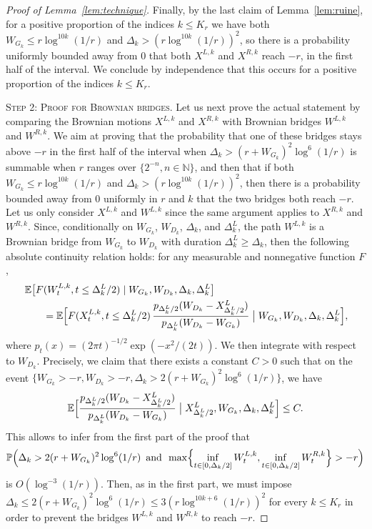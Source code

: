 \documentclass[10pt,a4paper]{amsart}
\newcommand{\E}{\mathop{}\!\mathbb{E}}
\newcommand{\N}{\mathbb{N}}
\renewcommand{\P}{\mathop{}\!\mathbb{P}}
\begin{document}
\begin{proof}[Proof of Lemma~\ref{lem:technique}]
Finally, by the last claim of Lemma~\ref{lem:ruine}, for a positive proportion of the indices $k \leq K_r$ we have both $W_{G_k} \leq r \log^{10k}(1/r)$ and $\Delta_k > (r \log^{10k}(1/r))^2$, so there is a probability uniformly bounded away from $0$ that both $X^{L,k}$ and $X^{R,k}$ reach $-r$, in the first half of the interval.
We conclude by independence that this occurs for a positive proportion of the indices $k \leq K_r$.
\medskip

\textsc{Step 2: Proof for Brownian bridges.}
Let us next prove the actual statement by comparing the Brownian motions $X^{L,k}$ and $X^{R,k}$ with Brownian bridges $W^{L,k}$ and $W^{R,k}$. We aim at proving that the probability that one of these bridges stays above $-r$ in the first half of the interval when $\Delta_k > (r+W_{G_k})^2 \log^6(1/r)$ is summable when $r$ ranges over $\{2^{-n}, n \in\N\}$, and then that if both $W_{G_k} \leq r \log^{10k}(1/r)$ and $\Delta_k > (r \log^{10k}(1/r))^2$, then there is a probability bounded away from $0$ uniformly in $r$ and $k$ that the two bridges both reach $-r$.
Let us only consider $X^{L,k}$ and $W^{L,k}$ since the same argument applies to $X^{R,k}$ and $W^{R,k}$.
Since, conditionally on $W_{G_k}$, $W_{D_k}$, $\Delta_k$, and $\Delta^L_k$, the path $W^{L,k}$ is a Brownian bridge from $W_{G_k}$ to $W_{D_k}$ with duration $\Delta^L_k \geq \Delta_k$, then the following absolute continuity relation holds: for any measurable and nonnegative function $F$,
\begin{align*}
&\E\bigl[F(W^{L,k}_{t}, t \leq \Delta^L_k/2) \mid W_{G_k}, W_{D_k}, \Delta_k, \Delta^L_k\bigr] \\
& \qquad = \E\Bigl[F(X^{L,k}_t, t \leq \Delta^L_k/2) \, \frac{p_{\Delta^L_k/2}(W_{D_k}-X^L_{\Delta^L_k/2})}{p_{\Delta^L_k}(W_{D_k}-W_{G_k})} \bigm| W_{G_k}, W_{D_k}, \Delta_k, \Delta^L_k\Bigr]
,
\end{align*}
where $p_t(x) = (2\pi t)^{-1/2} \exp(-x^2/(2t))$.
We then integrate with respect to $W_{D_k}$. Precisely, we claim that there exists a constant $C>0$ such that
on the event $\{W_{G_k}>-r, W_{D_k}>-r, \Delta_k > 2(r+W_{G_k})^2 \log^6(1/r)\}$, we have
\begin{equation}\label{eq:borne_ratio_technique}
\E\Bigl[\frac{p_{\Delta^L_k/2}(W_{D_k}-X^L_{\Delta^L_k/2})}{p_{\Delta^L_k}(W_{D_k}-W_{G_k})} \bigm| X^L_{\Delta^L_k/2}, W_{G_k}, \Delta_k, \Delta^L_k\Bigr]
\leq C
.\end{equation}
This allows to infer from the first part of the proof that
\[\P\Bigl(\Delta_k > 2(r+W_{G_k})^2 \log^6(1/r) \enskip\text{and}\enskip \max\Bigl\{\inf_{t \in [0,\Delta_k/2]} W^{L,k}_t, \inf_{t \in [0,\Delta_k/2]} W^{R,k}_t\Bigr\} > -r \Bigr)
\]
is $ O(\log^{-3}(1/r))$. 
Then, as in the first part, we must impose $\Delta_k \leq 2(r+W_{G_k})^2 \log^6(1/r) \leq 3(r \log^{10k+6}(1/r))^2$ for every $k \leq K_r$ in order to prevent the bridges $W^{L,k}$ and $W^{R,k}$ to reach $-r$.


\end{proof}
\end{document}
